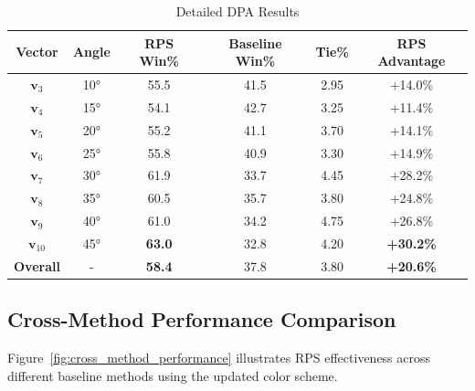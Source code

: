 \documentclass{article} %
\begin{document}
\begin{table}[t]
\centering
\caption{Detailed DPA Results}
\label{tab:dpa_detailed}
\begin{tabular}{c|c|c|c|c|c}
\toprule
\textbf{Vector} & \textbf{Angle} & \textbf{RPS Win\%} & \textbf{Baseline Win\%} & \textbf{Tie\%} & \textbf{RPS Advantage} \\
\midrule
$\mathbf{v}_3$ & 10° & 55.5 & 41.5 & 2.95 & \textcolor[HTML]{2878b5}{+14.0\%} \\
$\mathbf{v}_4$ & 15° & 54.1 & 42.7 & 3.25 & \textcolor[HTML]{2878b5}{+11.4\%} \\
$\mathbf{v}_5$ & 20° & 55.2 & 41.1 & 3.70 & \textcolor[HTML]{2878b5}{+14.1\%} \\
$\mathbf{v}_6$ & 25° & 55.8 & 40.9 & 3.30 & \textcolor[HTML]{2878b5}{+14.9\%} \\
$\mathbf{v}_7$ & 30° & 61.9 & 33.7 & 4.45 & \textcolor[HTML]{c82423}{+28.2\%} \\
$\mathbf{v}_8$ & 35° & 60.5 & 35.7 & 3.80 & \textcolor[HTML]{c82423}{+24.8\%} \\
$\mathbf{v}_9$ & 40° & 61.0 & 34.2 & 4.75 & \textcolor[HTML]{c82423}{+26.8\%} \\
$\mathbf{v}_{10}$ & 45° & \textbf{63.0} & 32.8 & 4.20 & \textcolor[HTML]{c82423}{\textbf{+30.2\%}} \\
\midrule
\textbf{Overall} & - & \textbf{58.4} & 37.8 & 3.80 & \textcolor[HTML]{c82423}{\textbf{+20.6\%}} \\
\bottomrule
\end{tabular}
\end{table}

\subsection{Cross-Method Performance Comparison}

Figure~\ref{fig:cross_method_performance} illustrates RPS effectiveness across different baseline methods using the updated color scheme.
\end{document}
